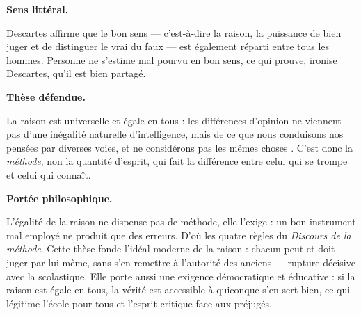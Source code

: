 \documentclass[11pt]{article}
\begin{document}
\begin{corrige}

\textbf{Sens littéral.}\par Descartes affirme que le bon sens — c'est-à-dire la raison, la puissance de bien juger et de distinguer le vrai du faux — est également réparti entre tous les hommes. Personne ne s'estime mal pourvu en bon sens, ce qui prouve, ironise Descartes, qu'il est bien partagé.

\textbf{Thèse défendue.}\par La raison est universelle et égale en tous : les différences d'opinion ne viennent pas d'une inégalité naturelle d'intelligence, mais de ce que \guillemotleft nous conduisons nos pensées par diverses voies, et ne considérons pas les mêmes choses \guillemotright. C'est donc la \emph{méthode}, non la quantité d'esprit, qui fait la différence entre celui qui se trompe et celui qui connaît.

\textbf{Portée philosophique.}\par L'égalité de la raison ne dispense pas de méthode, elle l'exige : un bon instrument mal employé ne produit que des erreurs. D'où les quatre règles du \emph{Discours de la méthode}. Cette thèse fonde l'idéal moderne de la raison : chacun peut et doit juger par lui-même, sans s'en remettre à l'autorité des anciens — rupture décisive avec la scolastique. Elle porte aussi une exigence démocratique et éducative : si la raison est égale en tous, la vérité est accessible à quiconque s'en sert bien, ce qui légitime l'école pour tous et l'esprit critique face aux préjugés.

\end{corrige}
\end{document}
